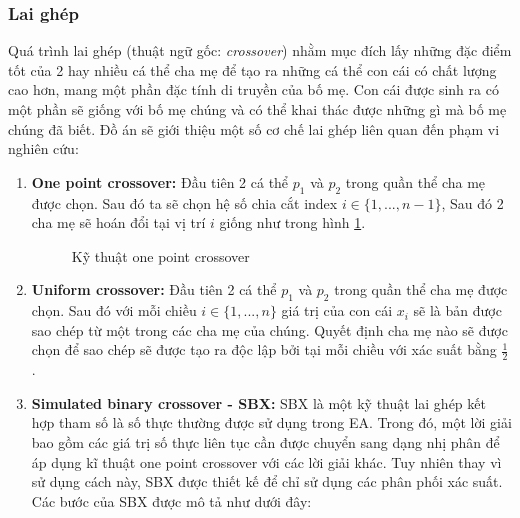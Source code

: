 \subsubsection{Lai ghép}
Quá trình lai ghép (thuật ngữ gốc: \emph{crossover}) nhằm mục đích lấy những đặc điểm tốt của 2 hay nhiều cá thể cha mẹ để tạo ra những cá thể con cái có chất lượng cao hơn, mang một phần đặc tính di truyền của bố mẹ. Con cái được sinh ra có một phần sẽ giống với bố mẹ chúng và có thể khai thác được những gì mà bố mẹ chúng đã biết. Đồ án sẽ giới thiệu một số cơ chế lai ghép liên quan đến phạm vi nghiên cứu:

\begin{enumerate}
    \item \textbf{One point crossover:} Đầu tiên 2 cá thể $p_1$ và $p_2$ trong quần thể cha mẹ được chọn. Sau đó ta sẽ chọn hệ số chia cắt index $i \in \{1, ..., n-1\}$, Sau đó 2 cha mẹ sẽ hoán đổi tại vị trí $i$ giống như trong hình \ref{fig:introduction:one_point}.
    \begin{figure}[ht]
        \centering
        \caption{Kỹ thuật one point crossover}
        \label{fig:introduction:one_point}
    \end{figure}
    \item \textbf{Uniform crossover:} Đầu tiên 2 cá thể $p_1$ và $p_2$ trong quần thể cha mẹ được chọn. Sau đó với mỗi chiều $i \in \{1, ..., n\}$ giá trị của con cái $x_i$ sẽ là bản được sao chép từ một trong các cha mẹ của chúng. Quyết định cha mẹ nào sẽ được chọn để sao chép sẽ được tạo ra độc lập bởi tại mỗi chiều với xác suất bằng $\frac{1}{2}$.
    \item \textbf{Simulated binary crossover - SBX:} SBX \cite{deb1995simulated} \cite{deb94simulated} là một kỹ thuật lai ghép kết hợp tham số là số thực thường được sử dụng trong EA. Trong đó, một lời giải bao gồm các giá trị số thực liên tục cần được chuyển sang dạng nhị phân để áp dụng kĩ thuật one point crossover với các lời giải khác. Tuy nhiên thay vì sử dụng cách này, SBX được thiết kế để chỉ sử dụng các phân phối xác suất. Các bước của SBX được mô tả như dưới đây:
        \begin{enumerate}

\end{enumerate}
\end{enumerate}
